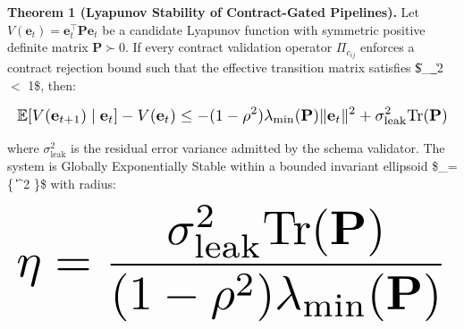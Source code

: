 \documentclass[10pt,journal,compsoc,twocolumn]{IEEEtran}
\begin{document}
\textbf{Theorem 1 (Lyapunov Stability of Contract-Gated Pipelines).} Let $V(\mathbf{e}_t) = \mathbf{e}_t^\top \mathbf{P} \mathbf{e}_t$ be a candidate Lyapunov function with symmetric positive definite matrix $\mathbf{P} \succ 0$. If every contract validation operator $\Pi_{c_{ij}}$ enforces a contract rejection bound such that the effective transition matrix satisfies \$\|\_{}\|\_2 \le \rho $<$ 1\$, then:





















\begin{equation}
\resizebox{\columnwidth}{!}{$\displaystyle
\begin{aligned}
\mathbb{E}[V(\mathbf{e}_{t+1}) \mid \mathbf{e}_t] - V(\mathbf{e}_t) \le -(1 - \rho^2) \lambda_{\min}(\mathbf{P}) \|\mathbf{e}_t\|^2 + \sigma_{\text{leak}}^2 \text{Tr}(\mathbf{P})
\end{aligned}
$}
\end{equation}





















where $\sigma_{\text{leak}}^2$ is the residual error variance admitted by the schema validator. The system is Globally Exponentially Stable within a bounded invariant ellipsoid \$\_\eta = \{ \mid \|\|^2 \le \eta\}\$ with radius:





















\begin{equation}
\resizebox{\columnwidth}{!}{$\displaystyle
\begin{aligned}
\eta = \frac{\sigma_{\text{leak}}^2 \text{Tr}(\mathbf{P})}{(1 - \rho^2) \lambda_{\min}(\mathbf{P})}
\end{aligned}
$}
\end{equation}
\end{document}
